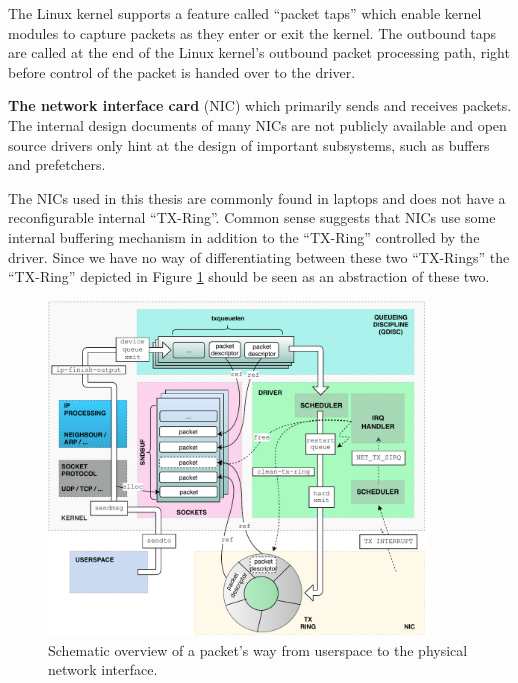 The Linux kernel supports a feature called ``packet taps'' which enable
kernel modules to capture packets as they enter or exit the kernel. The
outbound taps are called  at the end of the Linux kernel's outbound packet
processing path, right before control of  the packet is handed over to the
driver.

\textbf{The network interface card} (NIC) which primarily sends and
receives packets.  The internal design documents of many NICs are not publicly
available and open source drivers only hint at the design of important
subsystems, such as buffers and prefetchers.

The NICs used in this thesis are commonly found in laptops and does not
have a reconfigurable internal ``TX-Ring''. Common sense suggests that
NICs use some internal buffering mechanism in addition to the ``TX-Ring''
controlled by the driver. Since we have no way of differentiating between
these two ``TX-Rings'' the ``TX-Ring'' depicted in Figure
\ref{fig:linux_egress} should be seen as an abstraction of these two.


\begin{figure}
\center
\includegraphics[width=0.9\textwidth]{images/linux-egress-overview.pdf}
\caption{Schematic overview of a packet's way from userspace to the physical network interface.}
\label{fig:linux_egress}
\end{figure}

